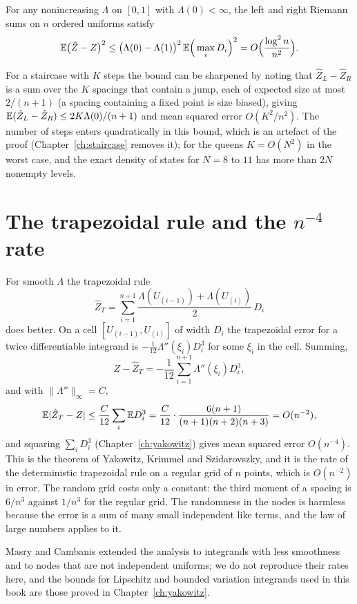 \begin{theorem}
\label{thm:riemannmono}
For any nonincreasing $\Lambda$ on $[0,1]$ with $\Lambda(0) < \infty$, the left and right Riemann sums on $n$ ordered uniforms satisfy
\[
\mathbb{E} \big( \hat Z - Z \big)^2 \le \big( \Lambda(0) - \Lambda(1) \big)^2 \, \mathbb{E} \Big( \max_i D_i \Big)^2 = O\Big( \frac{\log^2 n}{n^2} \Big) .
\]
\end{theorem}

For a staircase with $K$ steps the bound can be sharpened by noting that $\hat Z_L - \hat Z_R$ is a sum over the $K$ spacings that contain a jump, each of expected size at most $2/(n+1)$ (a spacing containing a fixed point is size biased), giving $\mathbb{E}(\hat Z_L - \hat Z_R) \le 2 K \Lambda(0) / (n+1)$ and mean squared error $O(K^2 / n^2)$. The number of steps enters quadratically in this bound, which is an artefact of the proof (Chapter~\ref{ch:staircase} removes it); for the queens $K = O(N^2)$ in the worst case, and the exact density of states for $N = 8$ to $11$ has more than $2N$ nonempty levels.

\section{The trapezoidal rule and the $n^{-4}$ rate}

For smooth $\Lambda$ the trapezoidal rule
\[
\hat Z_T = \sum_{i=1}^{n+1} \frac{\Lambda(U_{(i-1)}) + \Lambda(U_{(i)})}{2} \, D_i
\]
does better. On a cell $[U_{(i-1)}, U_{(i)}]$ of width $D_i$ the trapezoidal error for a twice differentiable integrand is $-\tfrac{1}{12} \Lambda''(\xi_i) D_i^3$ for some $\xi_i$ in the cell. Summing,
\[
Z - \hat Z_T = -\frac{1}{12} \sum_{i=1}^{n+1} \Lambda''(\xi_i) D_i^3 ,
\]
and with $\|\Lambda''\|_\infty = C$,
\[
\mathbb{E} | \hat Z_T - Z | \le \frac{C}{12} \sum_i \mathbb{E} D_i^3 = \frac{C}{12} \cdot \frac{6 (n+1)}{(n+1)(n+2)(n+3)} = O(n^{-2}) ,
\]
and squaring $\sum_i D_i^3$ (Chapter~\ref{ch:yakowitz}) gives mean squared error $O(n^{-4})$. This is the theorem of Yakowitz, Krimmel and Szidarovszky, and it is the rate of the deterministic trapezoidal rule on a regular grid of $n$ points, which is $O(n^{-2})$ in error. The random grid costs only a constant: the third moment of a spacing is $6/n^3$ against $1/n^3$ for the regular grid. The randomness in the nodes is harmless because the error is a sum of many small independent like terms, and the law of large numbers applies to it.

Masry and Cambanis \cite{MasryCambanis} extended the analysis to integrands with less smoothness and to nodes that are not independent uniforms; we do not reproduce their rates here, and the bounds for Lipschitz and bounded variation integrands used in this book are those proved in Chapter~\ref{ch:yakowitz}.

